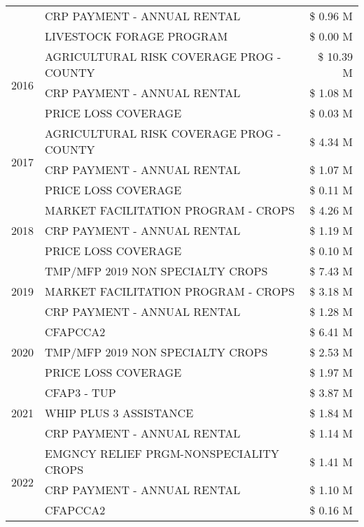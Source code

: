 \begin{tabular}{llr}
 & CRP PAYMENT - ANNUAL RENTAL & \$ 0.96 M \\
 & LIVESTOCK FORAGE PROGRAM & \$ 0.00 M \\
\cline{1-3}
\multirow[t]{3}{*}{2016} & AGRICULTURAL RISK COVERAGE PROG - COUNTY & \$ 10.39 M \\
 & CRP PAYMENT - ANNUAL RENTAL & \$ 1.08 M \\
 & PRICE LOSS COVERAGE & \$ 0.03 M \\
\cline{1-3}
\multirow[t]{3}{*}{2017} & AGRICULTURAL RISK COVERAGE PROG - COUNTY & \$ 4.34 M \\
 & CRP PAYMENT - ANNUAL RENTAL & \$ 1.07 M \\
 & PRICE LOSS COVERAGE & \$ 0.11 M \\
\cline{1-3}
\multirow[t]{3}{*}{2018} & MARKET FACILITATION PROGRAM - CROPS & \$ 4.26 M \\
 & CRP PAYMENT - ANNUAL RENTAL & \$ 1.19 M \\
 & PRICE LOSS COVERAGE & \$ 0.10 M \\
\cline{1-3}
\multirow[t]{3}{*}{2019} & TMP/MFP 2019 NON SPECIALTY CROPS & \$ 7.43 M \\
 & MARKET FACILITATION PROGRAM - CROPS & \$ 3.18 M \\
 & CRP PAYMENT - ANNUAL RENTAL & \$ 1.28 M \\
\cline{1-3}
\multirow[t]{3}{*}{2020} & CFAPCCA2 & \$ 6.41 M \\
 & TMP/MFP 2019 NON SPECIALTY CROPS & \$ 2.53 M \\
 & PRICE LOSS COVERAGE & \$ 1.97 M \\
\cline{1-3}
\multirow[t]{3}{*}{2021} & CFAP3 - TUP & \$ 3.87 M \\
 & WHIP PLUS 3 ASSISTANCE & \$ 1.84 M \\
 & CRP PAYMENT - ANNUAL RENTAL & \$ 1.14 M \\
\cline{1-3}
\multirow[t]{3}{*}{2022} & EMGNCY RELIEF PRGM-NONSPECIALITY CROPS & \$ 1.41 M \\
 & CRP PAYMENT - ANNUAL RENTAL & \$ 1.10 M \\
 & CFAPCCA2 & \$ 0.16 M \\
\cline{1-3}
\bottomrule
\end{tabular}
